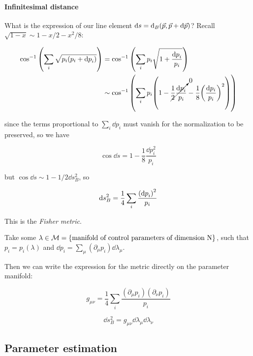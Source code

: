 \documentclass[main.tex]{subfiles}
\begin{document}
\paragraph{Infinitesimal distance}

What is the expression of our line element  \(\dd{s} =  \dd _{B} \qty(\vec{p} , \vec{p} + \dd{\vec{p}}) \)? Recall \(\sqrt{1-x} \sim 1 - x/2 -x^2/8\):

\begin{align}
  \cos ^{-1} \qty(\sum_i \sqrt{p_i(p_i + \dd{p}_i)})
  &= \cos ^{-1} \qty(\sum_i p_i \sqrt{1 + \frac{\dd{p}_i }{p_i}})  \\
  &\sim \cos ^{-1} \qty(\sum_i p_i \qty(1 - \cancelto{0}{\frac{1}{2} \frac{\dd{p}_i}{p_i}}
  - \frac{1}{8} \qty(\frac{\dd{p_i}}{p_i})^{2} ))
\end{align}

since the terms proportional to \( \sum_i \dd{p}_i \) must vanish for the normalization to be preserved, so we have

\begin{equation}
  \cos \dd{s} = 1 - \frac{1}{8}\frac{\dd{p}_i ^{2} }{p_i}
\end{equation}

but \( \cos \dd{s} \sim 1 - 1/2 \dd{s}^{2} _{B}  \), so

\begin{equation} \label{eq:fisher-metric}
  \dd{s}^{2}_{B}  = \frac{1}{4} \sum_i  \frac{\qty(\dd{p}_i)^{2} }{p_i}
\end{equation}

This is the \emph{Fisher metric}.

Take some \( \lambda \in \mathcal{M} = \qty{\text{manifold of control parameters of dimension N}} \), such that \( p_i = p_i(\lambda) \) and  \( \dd{p}_i = \sum_\mu (\partial_\mu p_i) \dd{\lambda_\mu} \).

Then we can write the expression for the metric directly on the parameter manifold:

\begin{equation}
  g _{\mu \nu} = \frac{1}{4} \sum_i \frac{(\partial_\mu p_i)(\partial_\nu p_i)}{p_i}
\end{equation}

\begin{equation}
  \dd{s}_B ^2 = g _{\mu \nu} \dd{\lambda}_\mu \dd{\lambda}_\nu
\end{equation}

\subsection{Parameter estimation}
\end{document}
